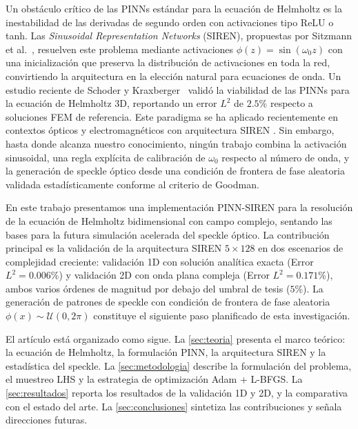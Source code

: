 Un obstáculo crítico de las PINNs estándar para la ecuación de Helmholtz es la inestabilidad
de las derivadas de segundo orden con activaciones tipo ReLU o tanh.
Las \textit{Sinusoidal Representation Networks} (SIREN), propuestas por
Sitzmann et al.~\cite{Sitzmann2020_SIREN}, resuelven este problema mediante activaciones
$\phi(z) = \sin(\omega_0 z)$ con una inicialización que preserva la distribución de
activaciones en toda la red, convirtiendo la arquitectura en la elección natural para
ecuaciones de onda.
Un estudio reciente de Schoder y Kraxberger~\cite{Schoder2024_PINN_acoustics} validó la viabilidad de las PINNs
para la ecuación de Helmholtz 3D, reportando un error $L^2$ de $2.5\%$ respecto a soluciones
FEM de referencia.
Este paradigma se ha aplicado recientemente en contextos ópticos y electromagnéticos con
arquitectura SIREN \cite{Panagiotakopoulos2026_Helmholtz}. Sin embargo, hasta donde alcanza
nuestro conocimiento, ningún trabajo combina la activación sinusoidal, una regla explícita de
calibración de $\omega_0$ respecto al número de onda, y la generación de speckle óptico desde
una condición de frontera de fase aleatoria validada estadísticamente conforme al criterio de
Goodman.

En este trabajo presentamos una implementación PINN-SIREN para la resolución de la ecuación
de Helmholtz bidimensional con campo complejo, sentando las bases para la futura simulación
acelerada del speckle óptico.
La contribución principal es la validación de la arquitectura SIREN $5\times128$ en dos
escenarios de complejidad creciente: validación 1D con solución analítica exacta
(Error $L^2 = 0.006\%$) y validación 2D con onda plana compleja (Error $L^2 = 0.171\%$),
ambos varios órdenes de magnitud por debajo del umbral de tesis ($5\%$).
La generación de patrones de speckle con condición de frontera de fase aleatoria
$\phi(x) \sim \mathcal{U}(0, 2\pi)$ constituye el siguiente paso planificado de esta investigación.

El artículo está organizado como sigue.
La \cref{sec:teoria} presenta el marco teórico: la ecuación de Helmholtz, la formulación PINN,
la arquitectura SIREN y la estadística del speckle.
La \cref{sec:metodologia} describe la formulación del problema, el muestreo LHS y la
estrategia de optimización Adam + L-BFGS.
La \cref{sec:resultados} reporta los resultados de la validación 1D y 2D, y la comparativa
con el estado del arte.
La \cref{sec:conclusiones} sintetiza las contribuciones y señala direcciones futuras.

